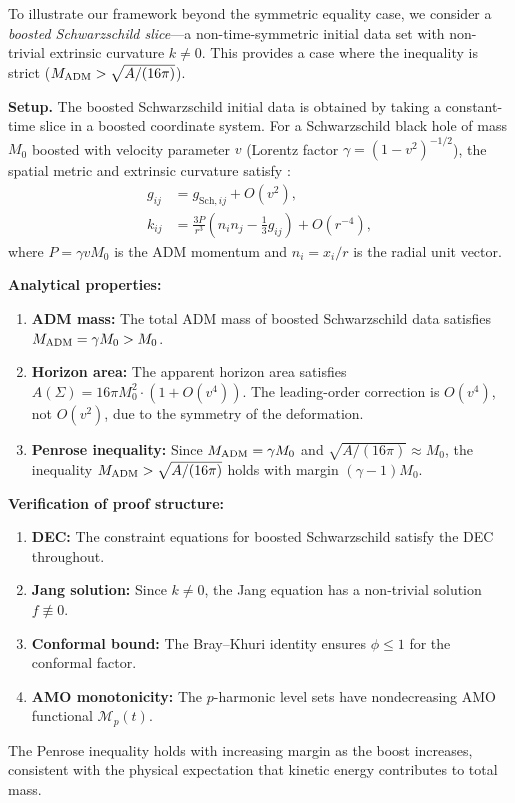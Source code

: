 \begin{example}\label{ex:BoostedSchwarzschild}
To illustrate our framework beyond the symmetric equality case, we consider a \textit{boosted Schwarzschild slice}---a non-time-symmetric initial data set with non-trivial extrinsic curvature $k \neq 0$. This provides a case where the inequality is strict ($M_{\mathrm{ADM}} > \sqrt{A/(16\pi)}$).

\textbf{Setup.} The boosted Schwarzschild initial data is obtained by taking a constant-time slice in a boosted coordinate system. For a Schwarzschild black hole of mass $M_0$ boosted with velocity parameter $v$ (Lorentz factor $\gamma = (1-v^2)^{-1/2}$), the spatial metric and extrinsic curvature satisfy \cite{bowen1980}:
\begin{align}
    g_{ij} &= g_{\mathrm{Sch},ij} + O(v^2), \\
    k_{ij} &= \frac{3P}{r^3}\left(n_i n_j - \frac{1}{3}g_{ij}\right) + O(r^{-4}),
\end{align}
where $P = \gamma v M_0$ is the ADM momentum and $n_i = x_i/r$ is the radial unit vector.

\textbf{Analytical properties:}
\begin{enumerate}
    \item \textbf{ADM mass:} The total ADM mass of boosted Schwarzschild data satisfies $M_{\mathrm{ADM}} = \gamma M_0 > M_0$.
    
    \item \textbf{Horizon area:} The apparent horizon area satisfies $A(\Sigma) = 16\pi M_0^2 \cdot (1 + O(v^4))$. The leading-order correction is $O(v^4)$, not $O(v^2)$, due to the symmetry of the deformation.
    
    \item \textbf{Penrose inequality:} Since $M_{\mathrm{ADM}} = \gamma M_0$ and $\sqrt{A/(16\pi)} \approx M_0$, the inequality $M_{\mathrm{ADM}} > \sqrt{A/(16\pi)}$ holds with margin $(\gamma - 1)M_0$.
\end{enumerate}

\textbf{Verification of proof structure:}
\begin{enumerate}
    \item \textbf{DEC:} The constraint equations for boosted Schwarzschild satisfy the DEC throughout.
    
    \item \textbf{Jang solution:} Since $k \neq 0$, the Jang equation has a non-trivial solution $f \not\equiv 0$.
    
    \item \textbf{Conformal bound:} The Bray--Khuri identity ensures $\phi \leq 1$ for the conformal factor.
    
    \item \textbf{AMO monotonicity:} The $p$-harmonic level sets have nondecreasing AMO functional $\mathcal{M}_p(t)$.
\end{enumerate}

The Penrose inequality holds with increasing margin as the boost increases, consistent with the physical expectation that kinetic energy contributes to total mass.
\end{example}

